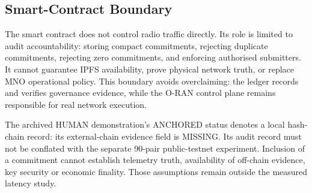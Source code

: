 \documentclass[journal]{IEEEtran}
\newif\ifshowrevisions
\newenvironment{revision}{\begingroup\ifshowrevisions\color{blue}\else\color{black}\fi}{\endgroup}
\begin{document}
\subsection{Smart-Contract Boundary}
The smart contract does not control radio traffic directly. Its role is
limited to audit accountability: storing compact commitments, rejecting
duplicate commitments, rejecting zero commitments, and enforcing authorised
submitters. It cannot guarantee IPFS availability, prove physical network
truth, or replace MNO operational policy. This boundary avoids overclaiming:
the ledger records and verifies governance evidence, while the O-RAN control
plane remains responsible for real network execution.

\begin{revision}
The archived HUMAN demonstration's ANCHORED status denotes a local hash-chain
record: its external-chain evidence field is MISSING. Its audit record must
not be conflated with the separate 90-pair public-testnet experiment. Inclusion
of a commitment cannot establish telemetry truth, availability of off-chain
evidence, key security or economic finality. Those assumptions remain outside
the measured latency study.
\end{revision}
\end{document}
